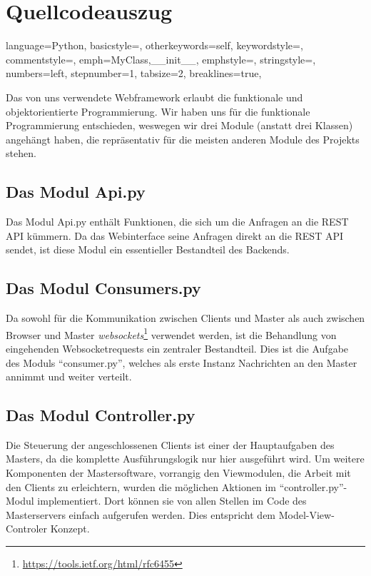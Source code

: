 \section{Quellcodeauszug}


\lstset
{
    language=Python,
    basicstyle=\footnotesize,
    otherkeywords={self},             %
    keywordstyle=\color{deepblue},
    commentstyle=\color{string-color},
    emph={MyClass,__init__},          %
    emphstyle=\color{deepred},    %
    stringstyle=\color{deepgreen},
    numbers=left,
    stepnumber=1,
    tabsize=2,
    breaklines=true,
}

Das von uns verwendete Webframework erlaubt die funktionale und objektorientierte Programmierung. Wir haben uns für die funktionale Programmierung
entschieden, weswegen wir drei Module (anstatt drei Klassen) angehängt haben, die repräsentativ für die meisten
anderen Module des Projekts stehen.

\subsection{Das Modul Api.py}
Das Modul Api.py enthält Funktionen, die sich um die Anfragen an die REST API kümmern.
Da das Webinterface seine Anfragen direkt an die REST API sendet, ist diese Modul ein essentieller
Bestandteil des Backends.


\subsection{Das Modul Consumers.py}
Da sowohl für die Kommunikation zwischen Clients und Master als auch zwischen Browser und
Master \textit{websockets}\footnote{\url{https://tools.ietf.org/html/rfc6455}} verwendet werden,
ist die Behandlung von eingehenden Websocketrequests ein zentraler Bestandteil. Dies ist die
Aufgabe des Moduls "`consumer.py"', welches als erste Instanz Nachrichten an den Master annimmt und
weiter verteilt.



\subsection{Das Modul Controller.py}
Die Steuerung der angeschlossenen Clients ist einer der Hauptaufgaben des Masters, da die komplette
Ausführungslogik nur hier ausgeführt wird. Um weitere Komponenten der Mastersoftware, vorrangig den Viewmodulen, die Arbeit mit den
Clients zu erleichtern, wurden die möglichen Aktionen im "`controller.py"'-Modul implementiert. Dort können
sie von allen Stellen im Code des Masterservers einfach aufgerufen werden. Dies entspricht dem Model-View-Controler Konzept.


